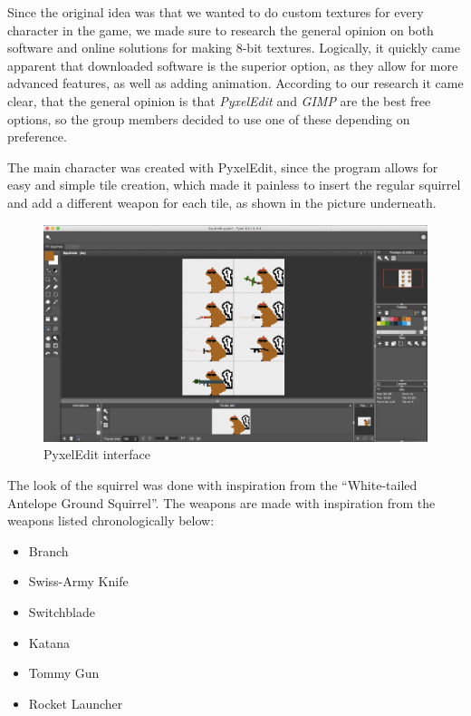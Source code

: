 \documentclass[12p]{article}
\begin{document}
Since the original idea was that we wanted to do custom textures for every character in the game, we made sure to research the general opinion on both software and online solutions for making 8-bit textures. Logically, it quickly came apparent that downloaded software is the superior option, as they allow for more advanced features, as well as adding animation. According to our research it came clear, that the general opinion is that \emph{PyxelEdit} \cite{PyxelEdit} and \emph{GIMP} \cite{GIMP} are the best free options, so the group members decided to use one of these depending on preference.

The main character was created with PyxelEdit, since the program allows for easy and simple tile creation, which made it painless to insert the regular squirrel and add a different weapon for each tile, as shown in the picture underneath.

\begin{figure}[ht]
 \center
 \includegraphics[width=1\textwidth]{Documentation/Picture1.png}
 \caption{PyxelEdit interface \cite{PyxelEdit}}
 \label{fig:pyxeledit_screenshot}
\end{figure}

\newpage 
The look of the squirrel was done with inspiration from the “White-tailed Antelope Ground Squirrel”. The weapons are made with inspiration from the weapons listed chronologically below:

\begin{itemize}
  \item Branch
  \item Swiss-Army Knife
  \item Switchblade
  \item Katana
  \item Tommy Gun
  \item Rocket Launcher
\end{itemize}
\end{document}
